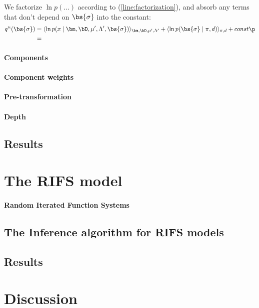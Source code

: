 We factorize $\ln p(\ldots)$ according to (\ref{line:factorization}), and absorb any terms that don't depend on $\bs{\sigma}$ into the constant:   
\begin{align*}
q^n(\bs{\sigma}) &= \langle \ln p(x \mid \bm, \bD, \mu', \Lambda', \bs{\sigma}) \rangle_{\bm, \bD, \mu', \Lambda'} +  \langle \ln p(\bs{\sigma} \mid \pi, d) \rangle_{\pi, d} + const \p\\
& = 
\end{align*}


\paragraph{Components}

\paragraph{Component weights}

\paragraph{Pre-transformation}

\paragraph{Depth}


\subsection{Results}

\section{The RIFS model}
\paragraph{Random Iterated Function Systems}

\subsection{The Inference algorithm for RIFS models}
\subsection{Results}

\section{Discussion}

